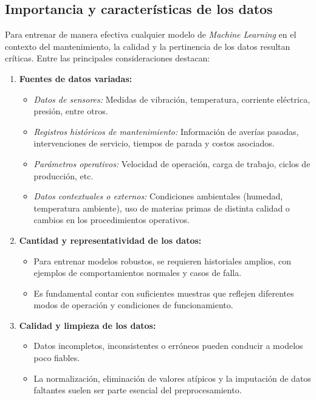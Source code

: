 \subsection{Importancia y características de los datos}

Para entrenar de manera efectiva cualquier modelo de \textit{Machine Learning} en el contexto del mantenimiento, la calidad y la pertinencia de los datos resultan críticas. Entre las principales consideraciones destacan:

\begin{enumerate}
    \item \textbf{Fuentes de datos variadas:}
        \begin{itemize}
            \item \textit{Datos de sensores:} Medidas de vibración, temperatura, corriente eléctrica, presión, entre otros.
            \item \textit{Registros históricos de mantenimiento:} Información de averías pasadas, intervenciones de servicio, tiempos de parada y costos asociados.
            \item \textit{Parámetros operativos:} Velocidad de operación, carga de trabajo, ciclos de producción, etc.
            \item \textit{Datos contextuales o externos:} Condiciones ambientales (humedad, temperatura ambiente), uso de materias primas de distinta calidad o cambios en los procedimientos operativos.
        \end{itemize}

    \item \textbf{Cantidad y representatividad de los datos:}
        \begin{itemize}
            \item Para entrenar modelos robustos, se requieren historiales amplios, con ejemplos de comportamientos normales y casos de falla.
            \item Es fundamental contar con suficientes muestras que reflejen diferentes modos de operación y condiciones de funcionamiento.
        \end{itemize}

    \item \textbf{Calidad y limpieza de los datos:}
        \begin{itemize}
            \item Datos incompletos, inconsistentes o erróneos pueden conducir a modelos poco fiables.
            \item La normalización, eliminación de valores atípicos y la imputación de datos faltantes suelen ser parte esencial del preprocesamiento.
        \end{itemize}


\end{enumerate}
